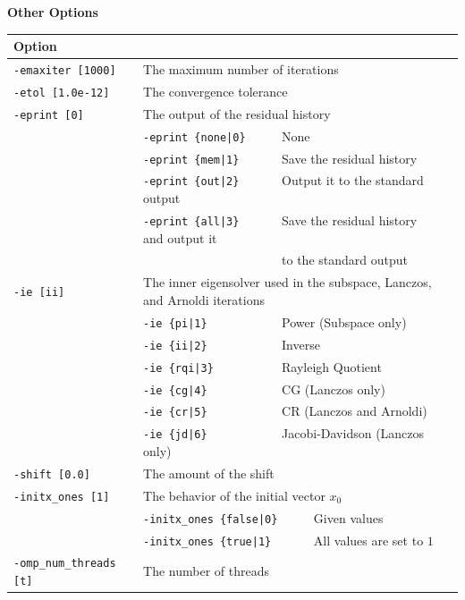 \documentclass[a4paper]{article}
\begin{document}
\begin{minipage}[t]{\textwidth}
\begin{center}
{\bf Other Options}\\
\begin{tabular}{l|ll}\hline\hline
Option &                          \\ \hline
\verb=-emaxiter [1000]= & The maximum number of iterations         \\ 
\verb=-etol [1.0e-12]=  & The convergence tolerance          \\
\verb=-eprint [0]=      & The output of the residual history                \\
                       & \verb=-eprint {none|0}     =  None \\
                       & \verb=-eprint {mem|1}      =  Save the residual history\\
                       & \verb=-eprint {out|2}      =  Output it to the standard output\\
                       & \verb=-eprint {all|3}      =  Save the residual history and output it \\
                       & \verb=                     =  to the standard output\\
\verb=-ie [ii]= & The inner eigensolver used in the subspace, Lanczos, and Arnoldi iterations\\
                       & \verb=-ie {pi|1}           =  Power (Subspace only) \\
                       & \verb=-ie {ii|2}           =  Inverse \\
                       & \verb=-ie {rqi|3}          =  Rayleigh Quotient \\
                       & \verb=-ie {cg|4}           =  CG (Lanczos only) \\
                       & \verb=-ie {cr|5}           =  CR (Lanczos and Arnoldi) \\
                       & \verb=-ie {jd|6}           =  Jacobi-Davidson (Lanczos only) \\
\verb=-shift [0.0]= & The amount of the shift  \\
\verb=-initx_ones [1]= & The behavior of the initial vector $x_{0}$  \\
                       & \verb=-initx_ones {false|0}     =  Given values \\  
                       & \verb=-initx_ones {true|1}      =  All values are set to $1$ \\
\verb=-omp_num_threads [t]= & The number of threads        \\ 

\end{tabular}
\end{center}
\end{minipage}
\end{document}
